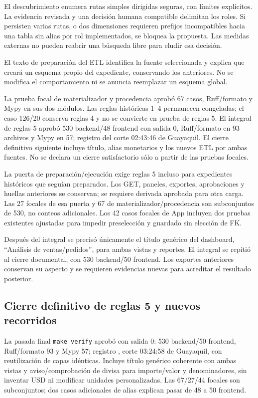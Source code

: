 \documentclass[11pt,letterpaper]{article}
\newcommand{\file}[1]{\texttt{#1}}
\begin{document}
El descubrimiento enumera rutas simples dirigidas seguras, con límites explícitos.
La evidencia revisada y una decisión humana compatible delimitan los roles. Si
persisten varias rutas, o dos dimensiones requieren prefijos incompatibles hacia
una tabla sin alias por rol implementados, se bloquea la propuesta. Las medidas
externas no pueden reabrir una búsqueda libre para eludir esa decisión.

El texto de preparación del ETL identifica la fuente seleccionada y explica
que creará un esquema propio del expediente, conservando los anteriores. No se
modifica el comportamiento ni se anuncia reemplazar un esquema global.

La prueba focal de materializador y procedencia aprobó 67 casos, Ruff/formato y
Mypy en sus dos módulos. Las reglas históricas 1--4 permanecen congeladas; el caso
126/20 conserva reglas 4 y no se convierte en prueba de reglas 5. El integral de reglas 5 aprobó 530 backend/48 frontend con salida 0, Ruff/formato
en 93 archivos y Mypy en 57; registro del corte 02:43:46 de Guayaquil. El cierre definitivo siguiente incluye título, alias monetarios y los nuevos
ETL por ambas fuentes.
No se declara un cierre satisfactorio sólo a partir de las pruebas focales.

La puerta de preparación/ejecución exige reglas 5 incluso para expedientes
históricos que seguían preparados. Los GET, paneles, exportes, aprobaciones y
huellas anteriores se conservan; se requiere derivada aprobada para otra carga.
Las 27 focales de esa puerta y 67 de materializador/procedencia son subconjuntos
de 530, no conteos adicionales. Los 42 casos focales de App incluyen dos pruebas
existentes ajustadas para impedir preselección y guardado sin elección de FK.

Después del integral se precisó únicamente el título genérico del dashboard,
``Análisis de ventas/pedidos'', para ambas vistas y reportes. El integral se repitió al cierre documental, con 530 backend/50 frontend. Los exportes anteriores conservan su aspecto y
se requieren evidencias nuevas para acreditar el resultado posterior.

\subsection{Cierre definitivo de reglas 5 y nuevos recorridos}
La pasada final \file{make verify} aprobó con salida 0: 530 backend/50 frontend,
Ruff/formato 93 y Mypy 57; registro
, corte 03:24:58 de Guayaquil,
con reutilización de capas idénticas. Incluye título genérico coherente con ambas
vistas y aviso/comprobación de divisa para importe/valor y denominadores, sin
inventar USD ni modificar unidades personalizadas. Las 67/27/44 focales son
subconjuntos; dos casos adicionales de alias explican pasar de 48 a 50 frontend.
\end{document}
